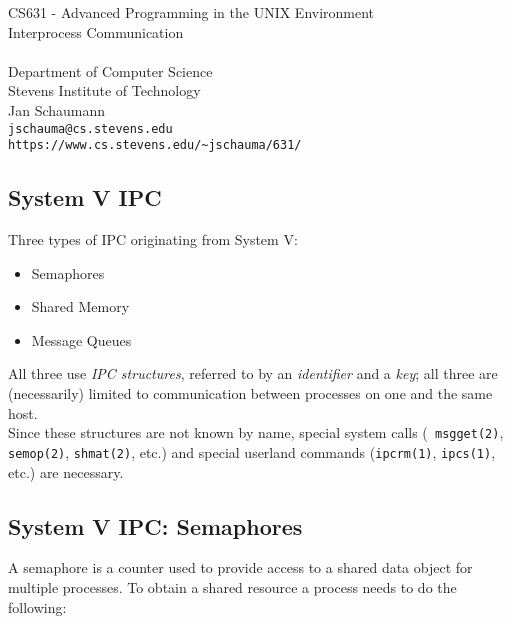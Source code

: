 \documentclass[xga]{xdvislides}
\begin{document}
\setfontphv

\lhead{\slidetitle}
\cfoot{\relax}
\rfoot{\Gray{\today}}

\vspace*{\fill}
\begin{center}
	\Hugesize
		CS631 - Advanced Programming in the UNIX Environment\\
		Interprocess Communication \\
	\hspace*{5mm}\blueline\\ [1em]

	\Normalsize
		Department of Computer Science\\
		Stevens Institute of Technology\\
		Jan Schaumann\\
		\verb+jschauma@cs.stevens.edu+\\
		\verb+https://www.cs.stevens.edu/~jschauma/631/+
\end{center}
\vspace*{\fill}

\subsection{System V IPC}
Three types of IPC originating from System V:
\begin{itemize}
	\item Semaphores
	\item Shared Memory
	\item Message Queues
\end{itemize}
\vspace{.5in}

All three use {\em IPC structures}, referred to by an {\em identifier} and a
{\em key}; all three are (necessarily) limited to communication between
processes on one and the same host.
\\

Since these structures are not known by name, special system calls ({\tt
msgget(2)}, {\tt semop(2)}, {\tt shmat(2)}, etc.) and special userland
commands ({\tt ipcrm(1)}, {\tt ipcs(1)}, etc.) are necessary.


\subsection{System V IPC: Semaphores}
A semaphore is a counter used to provide access to a shared data object for
multiple processes.  To obtain a shared resource a process needs to do the
following: \\
\end{document}
